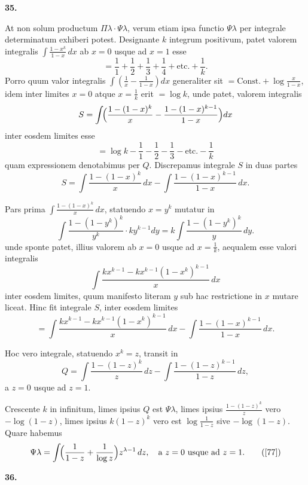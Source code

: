 \documentclass[12pt,a4paper]{article}
\newcommand{\art}[1]{\par\medskip\noindent\textbf{#1.}\par\nopagebreak\smallskip}
\begin{document}
\art{35}

At non solum productum $\Pi\lambda\cdot\Psi\lambda$, verum etiam ipsa functio $\Psi\lambda$ per integrale determinatum exhiberi potest. Designante $k$ integrum positivum, patet valorem integralis $\int\!\frac{1-x^k}{1-x}\,dx$ ab $x=0$ usque ad $x=1$ esse
\[
= \frac{1}{1} + \frac{1}{2} + \frac{1}{3} + \frac{1}{4} + \text{etc.} + \frac{1}{k}.
\]
Porro quum valor integralis $\int\!(\frac{1}{x}-\frac{1}{1-x})dx$ generaliter sit $=\text{Const.} + \log\frac{x}{1-x}$, idem inter limites $x=0$ atque $x=\frac{1}{k}$ erit $=\log k$, unde patet, valorem integralis
\[
S = \int\!\Bigl(\frac{1-(1-x)^k}{x} - \frac{1-(1-x)^{k-1}}{1-x}\Bigr)dx
\]
inter eosdem limites esse
\[
= \log k - \frac{1}{1} - \frac{1}{2} - \frac{1}{3} - \text{etc.} - \frac{1}{k}
\]
quam expressionem denotabimus per $Q$. Discrepamus integrale $S$ in duas partes
\[
S = \int\!\frac{1-(1-x)^k}{x}\,dx - \int\!\frac{1-(1-x)^{k-1}}{1-x}\,dx.
\]

Pars prima $\int\!\frac{1-(1-x)^k}{x}\,dx$, statuendo $x=y^k$ mutatur in
\[
\int\!\frac{1-(1-y^k)^k}{y^k}\cdot ky^{k-1}dy = k\int\!\frac{1-(1-y^k)^k}{y}\,dy.
\]
unde sponte patet, illius valorem ab $x=0$ usque ad $x=\frac{1}{k}$, aequalem esse valori integralis
\[
\int\!\frac{kx^{k-1}-kx^{k-1}(1-x^k)^{k-1}}{x}\,dx
\]
inter eosdem limites, quum manifesto literam $y$ sub hac restrictione in $x$ mutare liceat. Hinc fit integrale $S$, inter eosdem limites
\[
= \int\!\frac{kx^{k-1}-kx^{k-1}(1-x^k)^{k-1}}{x}\,dx - \int\!\frac{1-(1-x)^{k-1}}{1-x}\,dx.
\]

Hoc vero integrale, statuendo $x^k=z$, transit in
\[
Q = \int\!\frac{1-(1-z)^k}{z}\,dz - \int\!\frac{1-(1-z)^{k-1}}{1-z}\,dz,
\]
a $z=0$ usque ad $z=1$.

Crescente $k$ in infinitum, limes ipsius $Q$ est $\Psi\lambda$, limes ipsius $\frac{1-(1-z)^k}{z}$ vero $-\log(1-z)$, limes ipsius $k(1-z)^k$ vero est $\log\frac{1}{1-z}$ sive $-\log(1-z)$. Quare habemus
\begin{equation}
\Psi\lambda = \int\!\Bigl(\frac{1}{1-z} + \frac{1}{\log z}\Bigr)z^{\lambda-1}\,dz,\quad \text{a }z=0\text{ usque ad }z=1.\tag{[77]}
\end{equation}

\art{36}
\end{document}
